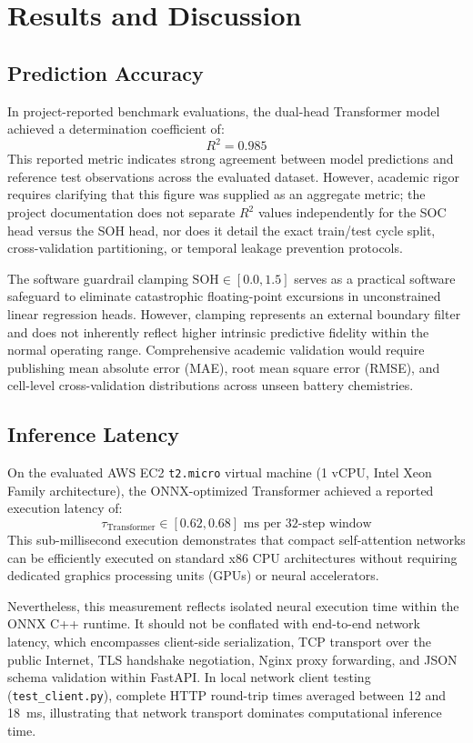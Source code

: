 \documentclass[conference]{IEEEtran}
\begin{document}
\section{Results and Discussion}

\subsection{Prediction Accuracy}
In project-reported benchmark evaluations, the dual-head Transformer model achieved a determination coefficient of:
\begin{equation}
R^2 = 0.985
\end{equation}
This reported metric indicates strong agreement between model predictions and reference test observations across the evaluated dataset. However, academic rigor requires clarifying that this figure was supplied as an aggregate metric; the project documentation does not separate $R^2$ values independently for the SOC head versus the SOH head, nor does it detail the exact train/test cycle split, cross-validation partitioning, or temporal leakage prevention protocols. 

The software guardrail clamping $\text{SOH} \in [0.0, 1.5]$ serves as a practical software safeguard to eliminate catastrophic floating-point excursions in unconstrained linear regression heads. However, clamping represents an external boundary filter and does not inherently reflect higher intrinsic predictive fidelity within the normal operating range. Comprehensive academic validation would require publishing mean absolute error (MAE), root mean square error (RMSE), and cell-level cross-validation distributions across unseen battery chemistries.

\subsection{Inference Latency}
On the evaluated AWS EC2 \texttt{t2.micro} virtual machine (1 vCPU, Intel Xeon Family architecture), the ONNX-optimized Transformer achieved a reported execution latency of:
\begin{equation}
\tau_{\text{Transformer}} \in [0.62, 0.68]\text{~ms per 32-step window}
\end{equation}
This sub-millisecond execution demonstrates that compact self-attention networks can be efficiently executed on standard x86 CPU architectures without requiring dedicated graphics processing units (GPUs) or neural accelerators.

Nevertheless, this measurement reflects isolated neural execution time within the ONNX C++ runtime. It should not be conflated with end-to-end network latency, which encompasses client-side serialization, TCP transport over the public Internet, TLS handshake negotiation, Nginx proxy forwarding, and JSON schema validation within FastAPI. In local network client testing (\texttt{test\_client.py}), complete HTTP round-trip times averaged between 12 and 18~ms, illustrating that network transport dominates computational inference time.
\end{document}
